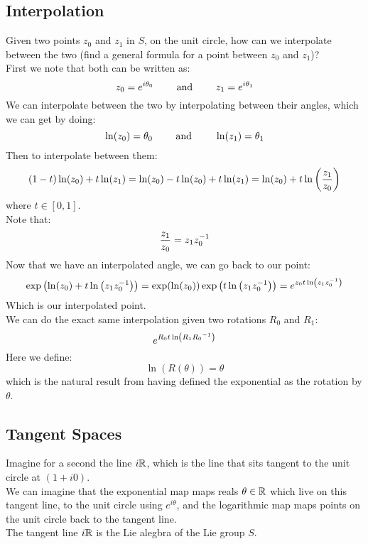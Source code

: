 \documentclass[12pt]{article}
\begin{document}
\newpage

\subsection*{Interpolation}

Given two points $z_0$ and $z_1$ in $S$,
on the unit circle, how can we interpolate
between the two (find a general formula
for a point between $z_0$ and $z_1$)? \\

First we note that both can be written as:
\[ z_0 = e^{i\theta_0} \qquad \text{ and } \qquad
z_1 = e^{i\theta_1} \]
We can interpolate between the two
by interpolating between their angles,
which we can get by doing:
\[ \ln(z_0) = \theta_0 \qquad \text{ and } \qquad 
\ln(z_1) = \theta_1 \]
Then to interpolate between them:
\[ (1-t)\ln(z_0) + t\ln(z_1)
= \ln(z_0) -t\ln(z_0) + t\ln(z_1) 
= \ln(z_0) + t\ln\left( \dfrac{z_1}{z_0} \right) \]
where $t \in [0, 1]$. \\
Note that:
\[ \dfrac{z_1}{z_0} = z_1z_0^{-1} \]
Now that we have an interpolated angle,
we can go back to our point:
\[ \exp\left( \ln(z_0) + t\ln\left( z_1z_0^{-1} \right) \right)
= \exp(\ln(z_0))
\exp\left( {t\ln\left( z_1z_0^{-1} \right)}  \right)
= e^{{z_0t\ln\left( z_1z_0^{-1} \right)}} \]
Which is our interpolated point. \\

We can do the exact same interpolation
given two rotations $R_0$ and $R_1$:
\[ e^{{R_0t\ln\left( {R_1}{R_0}^{-1} \right)}} \]
Here we define:
\[ \ln(R(\theta)) = \theta \]
which is the natural result from having
defined the exponential as the
rotation by $\theta$. \\

\newpage

\subsection*{Tangent Spaces}

Imagine for a second the line $i\mathbb{R}$,
which is the line that sits tangent
to the unit circle at $(1 + i0)$. \\
We can imagine that the exponential map
maps reals $\theta \in \mathbb{R}$ which live on this
tangent line, to the unit circle using
$e^{i\theta}$,
and the logarithmic map maps points on the
unit circle back to the tangent line. \\
The tangent line $i\mathbb{R}$ is the Lie alegbra
of the Lie group $S$. \\
\end{document}
